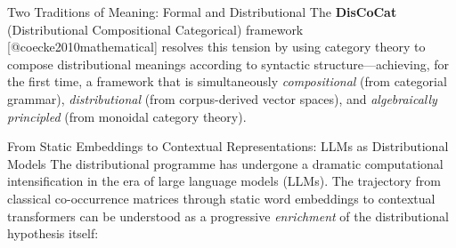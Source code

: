 \documentclass[
  ignorenonframetext,
]{beamer}
\begin{document}
\begin{frame}{Two Traditions of Meaning: Formal and Distributional}
The \textbf{DisCoCat} (Distributional Compositional Categorical)
framework {[}@coecke2010mathematical{]} resolves this tension by using
category theory to compose distributional meanings according to
syntactic structure---achieving, for the first time, a framework that is
simultaneously \emph{compositional} (from categorial grammar),
\emph{distributional} (from corpus-derived vector spaces), and
\emph{algebraically principled} (from monoidal category theory).
\end{frame}

\begin{frame}{From Static Embeddings to Contextual Representations: LLMs
as Distributional Models}
\protect{}\label{from-static-embeddings-to-contextual-representations-llms-as-distributional-models}
The distributional programme has undergone a dramatic computational
intensification in the era of large language models (LLMs). The
trajectory from classical co-occurrence matrices through static word
embeddings to contextual transformers can be understood as a progressive
\emph{enrichment} of the distributional hypothesis itself:


\end{frame}
\end{document}
